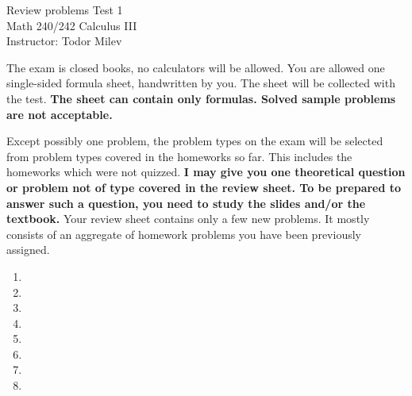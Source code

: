 \documentclass{article}
\begin{document}
\begin{center}
\Large
Review problems Test 1\\ Math 240/242 Calculus III \\ \normalsize Instructor: Todor Milev
\end{center}


\noindent The exam is closed books, no calculators will be allowed. You are allowed one single-sided formula sheet, handwritten by you. The sheet will be collected with the test. \textbf{The sheet can contain only formulas. Solved sample problems are not acceptable.}


Except possibly one problem, the problem types on the exam will be selected from problem types covered in the homeworks so far. This includes the homeworks which were not quizzed. \textbf{I may give you one theoretical question or problem not of type covered in the review sheet. To be prepared to answer such a question, you need to study the slides and/or the textbook.} Your review sheet contains only a few new problems. It mostly consists of an aggregate of homework problems you have been previously assigned.

\begin{enumerate}
\item

\item  
\item 



\item 
\item 

\item 
\item 

\item 



\end{enumerate}
\end{document}
